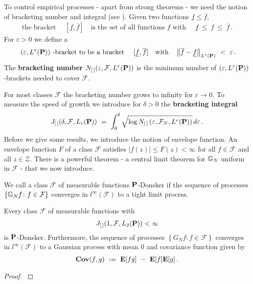 To control empirical processes - apart from strong theorems - we need the notion of bracketing number and integral (see \cite[page 270]{Vaart2000}). 
Given two functions $\underline{f}\le \overline{f}$,
\begin{gather*}
  \text{
the bracket
  }\quad
[\underline{f},\overline{f}]
\quad 
\text{
is the set of all functions $f$ with 
}\quad 
\underline{f}\ \le\ f \ \le\  \overline{f}
\,.
\end{gather*}
For $\varepsilon>0$
we define a
\begin{gather*}
  \text{
$(\varepsilon, L^{r}(\P))$ -bracket
to be a bracket
  }
  \quad
[\underline{f},\overline{f}]
\quad
\text{with}
\quad
\norm{\overline{f}-\underline{f}}_{ L^r(\P)}
\ <\  \varepsilon
\,.
\end{gather*}
The \textbf{
bracketing number
} 
$
N_{[\,]}(\varepsilon, \mathcal{F}, L^r(\P))
$
is 
the minimum number of 
$(\varepsilon, L^{r}(\P))$-brackets needed to cover $\mathcal{F}$.

For most classes $\mathcal{F}$ the bracketing number grows to infinity for $\varepsilon\to 0$.
To measure the speed of growth we introduce 
for $\delta>0$
the
\textbf{bracketing integral}
\begin{gather*}
     J
    _{[\,]}
    (
    \delta
    ,
    \mathcal{F}
    ,
    L_r(\P)
    )
    \ 
    =
    \ 
  \int_0^{\delta}
      \sqrt{
        \log 
      N_{[\,]}
\left( \varepsilon, \mathcal{F}_N, L^r(\P) \right)
    }
    \,
    d\varepsilon
    \,.
\end{gather*}
Before we give some results, we introduce the notion of envelope function.
An envelope function $F$ of a class $\mathcal{F}$ satisfies 
$|f(z)|\le F(z)< \infty$ for all $f\in\mathcal{F}$ and all $z\in\mathcal{Z}$.
\newpage
There is a powerful theorem - a central limit theorem for $\G_N$ uniform in $\mathcal{F}$ - that we now introduce.
\begin{definition}
  We call a class 
  $\mathcal{F}$ of measurable functions 
$\P$-Donsker
if the sequence of processes 
$\left\{ \G_N f \colon f\in\mathcal{F}\right\}$
converges in
$l^\infty(\mathcal{F})$
to a tight limit process.
\end{definition}

\begin{theorem}
  Every class $\mathcal{F}$ of measurable functions 
  with
  \begin{gather*}
    J
    _{[\,]}
    (
    1
    ,
    \mathcal{F}
    ,
    L_2(\P)
    )
    <\infty
  \end{gather*}
  is
  $\P$-Donsker.
  Furthermore,
  the sequence of processes 
$\left\{ G_N f \colon f\in\mathcal{F}\right\}$
  converges 
  in
$l^\infty(\mathcal{F})$
to a Gaussian process with mean 0 and covariance function given by
\begin{gather*}
  \mathbf{Cov}(f,g)
  \ 
  :=
  \ 
  \E[fg]
  \ 
  -
  \ 
  \E[f]\E[g]
  \,.
\end{gather*}
\end{theorem}
\begin{proof}
  \cite[Theorem~19.5]{Vaart2000}
\end{proof}



